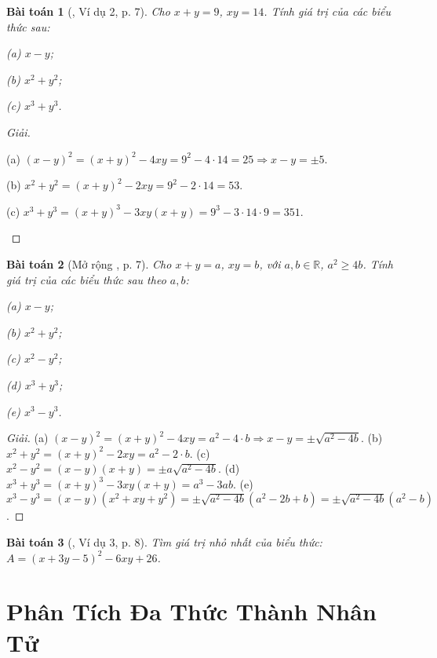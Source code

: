 \documentclass{article}
\numberwithin{equation}{section}
\newtheorem{baitoan}{Bài toán}[section]
\begin{document}
\begin{baitoan}[\cite{Tuyen_Toan_8}, Ví dụ 2, p. 7]
	Cho $x + y = 9$, $xy = 14$. Tính giá trị của các biểu thức sau:
	\begin{enumerate*}
		\item[(a)] $x - y$;
		\item[(b)] $x^2 + y^2$;
		\item[(c)] $x^3 + y^3$.
	\end{enumerate*}
\end{baitoan}

\begin{proof}[Giải]
	\begin{enumerate*}
		\item[(a)] $(x - y)^2 = (x + y)^2 - 4xy = 9^2 - 4\cdot14 = 25\Rightarrow x - y = \pm5$.
		\item[(b)] $x^2 + y^2 = (x + y)^2 - 2xy = 9^2 - 2\cdot14 = 53$.
		\item[(c)] $x^3 + y^3 = (x + y)^3 - 3xy(x + y) = 9^3 - 3\cdot14\cdot9 = 351$.
	\end{enumerate*}
\end{proof}

\begin{baitoan}[Mở rộng \cite{Tuyen_Toan_8}, p. 7]
	Cho $x + y = a$, $xy = b$, với $a,b\in\mathbb{R}$, $a^2\ge 4b$. Tính giá trị của các biểu thức sau theo $a,b$:
	\begin{enumerate*}
		\item[(a)] $x - y$;
		\item[(b)] $x^2 + y^2$;
		\item[(c)] $x^2 - y^2$;
		\item[(d)] $x^3 + y^3$;
		\item[(e)] $x^3 - y^3$.
	\end{enumerate*}
\end{baitoan}

\begin{proof}[Giải]
	(a) $(x - y)^2 = (x + y)^2 - 4xy = a^2 - 4\cdot b\Rightarrow x - y = \pm\sqrt{a^2 - 4b}$. (b) $x^2 + y^2 = (x + y)^2 - 2xy = a^2 - 2\cdot b$. (c) $x^2 - y^2 = (x - y)(x + y) = \pm a\sqrt{a^2 - 4b}$. (d) $x^3 + y^3 = (x + y)^3 - 3xy(x + y) = a^3 - 3ab$. (e) $x^3 - y^3 = (x - y)(x^2 + xy + y^2) = \pm\sqrt{a^2 - 4b}(a^2 - 2b + b) = \pm\sqrt{a^2 - 4b}(a^2 - b)$.
\end{proof}

\begin{baitoan}[\cite{Tuyen_Toan_8}, Ví dụ 3, p. 8]
	Tìm giá trị nhỏ nhất của biểu thức: $A = (x + 3y - 5)^2 - 6xy + 26$.
\end{baitoan}




\section{Phân Tích Đa Thức Thành Nhân Tử}


\printbibliography[heading=bibintoc]
	
\end{document}
